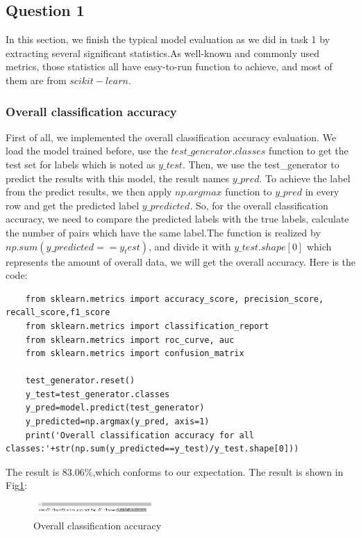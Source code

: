 \documentclass[conference]{IEEEtran}
\begin{document}
\subsection{Question 1}
In this section, we finish the typical model evaluation as we did in task 1 by extracting several significant statistics.As well-known and commonly used metrics, those statistics all have easy-to-run
function to achieve, and most of them are from $scikit-learn$.
\subsubsection{Overall classification accuracy}
First of all, we implemented the overall classification accuracy evaluation. We load the model trained before, use the $test\_generator.classes$ function to get the test set for labels which is noted as $y\_test$.
Then, we use the test\_generator to predict the results with this model, the result names $y\_pred$. To achieve the label from the predict results, we then apply $np.argmax$ function to $y\_pred$ in every row and get the predicted label $y\_predicted$. 
So, for the overall classification accuracy, we need to compare the predicted labels with the true labels, calculate the number of pairs which have the same label.The function is realized by $np.sum(y\_predicted==y_test)$, and divide it with $y\_test.shape[0]$ which represents the amount of overall data, we will get the overall accuracy.
Here is the code:
\begin{lstlisting}
    from sklearn.metrics import accuracy_score, precision_score, recall_score,f1_score
    from sklearn.metrics import classification_report
    from sklearn.metrics import roc_curve, auc
    from sklearn.metrics import confusion_matrix

    test_generator.reset()
    y_test=test_generator.classes
    y_pred=model.predict(test_generator)
    y_predicted=np.argmax(y_pred, axis=1)
    print('Overall classification accuracy for all classes:'+str(np.sum(y_predicted==y_test)/y_test.shape[0]))
\end{lstlisting}
The result is 83.06\%,which conforms to our expectation. The result is shown in Fig\ref{Fig.t3q1}:
\begin{figure}[h] 
    \centering
    \includegraphics[width=0.4\textwidth]{./graphs/T3Q1a.png}
    \caption{Overall classification accuracy}
    \label{Fig.t3q1}
\end{figure}
\end{document}
